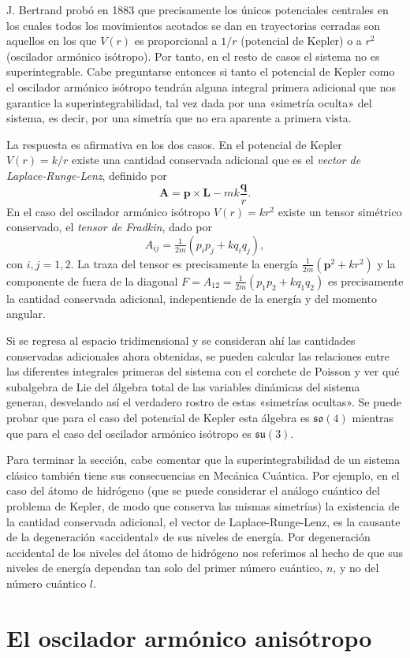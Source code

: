 \documentclass[12pt,a4paper,twocolumn,reqno]{amsart}
\theoremstyle{definition} \newtheorem{defn}[thm]{Definición}
\theoremstyle{definition} \newtheorem{ejemplo}[thm]{Ejemplo}
\theoremstyle{definition} \newtheorem{ejercicio}[thm]{Ejercicio}
\theoremstyle{remark} \newtheorem*{obs}{Observación}
\newcommand{\vect}[1]{\mathbf{#1}}
\begin{document}
J. Bertrand probó en 1883 que precisamente los únicos potenciales centrales en los cuales todos los movimientos acotados se dan en trayectorias cerradas son aquellos en los que $V(r)$ es proporcional a $1/r$ (potencial de Kepler) o a $r^2$ (oscilador armónico isótropo). Por tanto, en el resto de casos el sistema no es superintegrable. Cabe preguntarse entonces si tanto el potencial de Kepler como el oscilador armónico isótropo tendrán alguna integral primera adicional que nos garantice la superintegrabilidad, tal vez dada por una «simetría oculta» del sistema, es decir, por una simetría que no era aparente a primera vista.

La respuesta es afirmativa en los dos casos. En el potencial de Kepler $V(r)=k/r$ existe una cantidad conservada adicional que es el \emph{vector de Laplace-Runge-Lenz}, definido por
\begin{equation}
  \vect{A}=\vect{p}\times \vect{L}-mk\frac{\vect{q}}{r}. 
\end{equation}
En el caso del oscilador armónico isótropo $V(r)=kr^2$ existe un tensor simétrico conservado, el \emph{tensor de Fradkin}, dado por
\begin{equation}
  A_{ij}=\tfrac{1}{2m}(p_ip_j+kq_iq_j), 
\end{equation}
con $i,j=1,2$. La traza del tensor es precisamente la energía $\tfrac{1}{2m}(\vect{p}^2+kr^2)$ y la componente de fuera de la diagonal $F=A_{12}=\tfrac{1}{2m}(p_1p_2+kq_1q_2)$ es precisamente la cantidad conservada adicional, indepentiende de la energía y del momento angular. 

Si se regresa al espacio tridimensional y se consideran ahí las cantidades conservadas adicionales ahora obtenidas, se pueden calcular las relaciones entre las diferentes integrales primeras del sistema con el corchete de Poisson y ver qué subalgebra de Lie del álgebra total de las variables dinámicas del sistema generan, desvelando así el verdadero rostro de estas «simetrías ocultas». Se puede probar que para el caso del potencial de Kepler esta álgebra es $\mathfrak{so}(4)$ mientras que para el caso del oscilador armónico isótropo es $\mathfrak{su}(3)$.

Para terminar la sección, cabe comentar que la superintegrabilidad de un sistema clásico también tiene sus consecuencias en Mecánica Cuántica. Por ejemplo, en el caso del átomo de hidrógeno (que se puede considerar el análogo cuántico del problema de Kepler, de modo que conserva las mismas simetrías) la existencia de la cantidad conservada adicional, el vector de Laplace-Runge-Lenz, es la causante de la degeneración «accidental» de sus niveles de energía. Por degeneración accidental de los niveles del átomo de hidrógeno nos referimos al hecho de que sus niveles de energía dependan tan solo del primer número cuántico, $n$, y no del número cuántico $l$.

\section{El oscilador armónico anisótropo}
\end{document}

